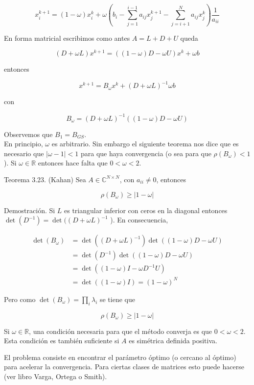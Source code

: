 \documentclass[10pt]{article}
\begin{document}
$$
x_{i}^{k+1}=(1-\omega) x_{i}^{k}+\omega\left(b_{i}-\sum_{j=1}^{i-1} a_{i j} x_{j}^{k+1}-\sum_{j=i+1}^{N} a_{i j} x_{j}^{k}\right) \frac{1}{a_{i i}}
$$

En forma matricial escribimos como antes $A=L+D+U$ queda

$$
(D+\omega L) x^{k+1}=((1-\omega) D-\omega U) x^{k}+\omega b
$$

entonces

$$
x^{k+1}=B_{\omega} x^{k}+(D+\omega L)^{-1} \omega b
$$

con

$$
B_{\omega}=(D+\omega L)^{-1}((1-\omega) D-\omega U)
$$

Observemos que $B_{1}=B_{G S}$.\\
En principio, $\omega$ es arbitrario. Sin embargo el siguiente teorema nos dice que es necesario que $|\omega-1|<1$ para que haya convergencia (o sea para que $\rho\left(B_{\omega}\right)<1$ ). Si $\omega \in \mathbb{R}$ entonces hace falta que $0<\omega<2$.

Teorema 3.23. (Kahan) Sea $A \in \mathbb{C}^{N \times N}$, con $a_{i i} \neq 0$, entonces

$$
\rho\left(B_{\omega}\right) \geq|1-\omega|
$$

Demostración. Si $L$ es triangular inferior con ceros en la diagonal entonces $\operatorname{det}\left(D^{-1}\right)=\operatorname{det}((D+ \omega L)^{-1}$ ). En consecuencia,

$$
\begin{aligned}
\operatorname{det}\left(B_{\omega}\right) & =\operatorname{det}\left((D+\omega L)^{-1}\right) \operatorname{det}((1-\omega) D-\omega U) \\
& =\operatorname{det}\left(D^{-1}\right) \operatorname{det}((1-\omega) D-\omega U) \\
& =\operatorname{det}\left((1-\omega) I-\omega D^{-1} U\right) \\
& =\operatorname{det}((1-\omega) I)=(1-\omega)^{N}
\end{aligned}
$$

Pero como $\operatorname{det}\left(B_{\omega}\right)=\prod_{i} \lambda_{i}$ se tiene que

$$
\rho\left(B_{\omega}\right) \geq|1-\omega|
$$

Si $\omega \in \mathbb{R}$, una condición necesaria para que el método converja es que $0<\omega<2$. Esta condición es también suficiente si $A$ es simétrica definida positiva.

El problema consiste en encontrar el parámetro óptimo (o cercano al óptimo) para acelerar la convergencia. Para ciertas clases de matrices esto puede hacerse (ver libro Varga, Ortega o Smith).
\end{document}
